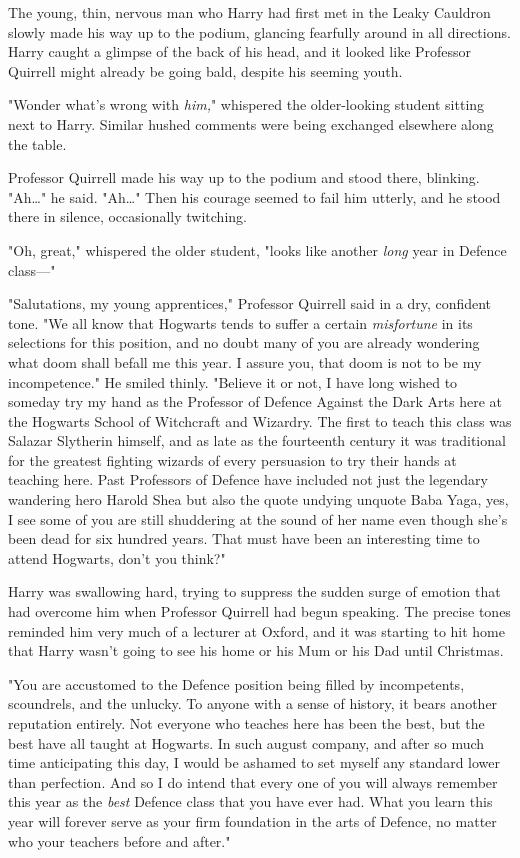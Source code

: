 The young, thin, nervous man who Harry had first met in the Leaky Cauldron 
slowly made his way up to the podium, glancing fearfully around in all 
directions. Harry caught a glimpse of the back of his head, and it looked like 
Professor Quirrell might already be going bald, despite his seeming youth.

"Wonder what's wrong with \emph{him,}" whispered the older-looking student 
sitting next to Harry. Similar hushed comments were being exchanged elsewhere 
along the table.

Professor Quirrell made his way up to the podium and stood there, blinking. 
"Ah{\ldots}" he said. "Ah{\ldots}" Then his courage seemed to fail him utterly, 
and he stood there in silence, occasionally twitching.

"Oh, great," whispered the older student, "looks like another \emph{long} year 
in Defence class---"

"Salutations, my young apprentices," Professor Quirrell said in a dry, 
confident tone. "We all know that Hogwarts tends to suffer a certain 
\emph{misfortune} in its selections for this position, and no doubt many of you 
are already wondering what doom shall befall me this year. I assure you, that 
doom is not to be my incompetence." He smiled thinly. "Believe it or not, I 
have long wished to someday try my hand as the Professor of Defence Against the 
Dark Arts here at the Hogwarts School of Witchcraft and Wizardry. The first to 
teach this class was Salazar Slytherin himself, and as late as the fourteenth 
century it was traditional for the greatest fighting wizards of every 
persuasion to try their hands at teaching here. Past Professors of Defence have 
included not just the legendary wandering hero Harold Shea but also the quote 
undying unquote Baba Yaga, yes, I see some of you are still shuddering at the 
sound of her name even though she's been dead for six hundred years. That must 
have been an interesting time to attend Hogwarts, don't you think?"

Harry was swallowing hard, trying to suppress the sudden surge of emotion that 
had overcome him when Professor Quirrell had begun speaking. The precise tones 
reminded him very much of a lecturer at Oxford, and it was starting to hit home 
that Harry wasn't going to see his home or his Mum or his Dad until Christmas.

"You are accustomed to the Defence position being filled by incompetents, 
scoundrels, and the unlucky. To anyone with a sense of history, it bears 
another reputation entirely. Not everyone who teaches here has been the best, 
but the best have all taught at Hogwarts. In such august company, and after so 
much time anticipating this day, I would be ashamed to set myself any standard 
lower than perfection. And so I do intend that every one of you will always 
remember this year as the \emph{best} Defence class that you have ever had. 
What you learn this year will forever serve as your firm foundation in the arts 
of Defence, no matter who your teachers before and after."

